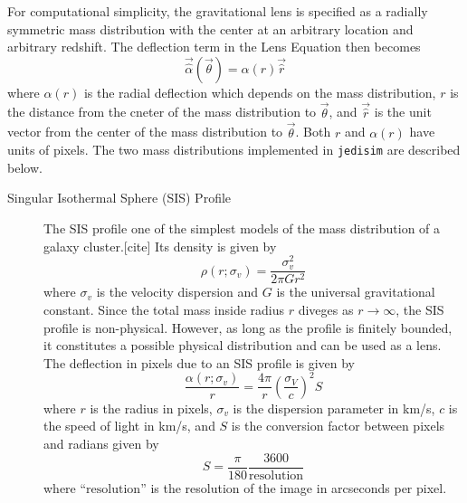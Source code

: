 \documentclass[10pt,twoside]{article}
\theoremstyle{definition}
\theoremstyle{exercise}
\begin{document}
For computational simplicity, the gravitational lens is specified as a radially symmetric mass distribution with the center at an arbitrary location and arbitrary redshift. The deflection term in the Lens Equation then becomes
\begin{equation}
  \vec{\hat{\alpha}}(\vec{\theta}) = \alpha(r) \vec{\hat{r}}
  \label{eq:rad_symm_lens_eq}
\end{equation}
where $\alpha(r)$ is the radial deflection which depends on the mass distribution, $r$ is the distance from the cneter of the mass distribution to $\vec{\theta}$, and $\vec{\hat{r}}$ is the unit vector from the center of the mass distribution to $\vec{\theta}$. Both $r$ and $\alpha(r)$ have units of pixels. The two mass distributions implemented in \texttt{jedisim} are described below.
\begin{description}
  \item[Singular Isothermal Sphere (SIS) Profile] The SIS profile one of the simplest models of the mass distribution of a galaxy cluster.[cite] Its density is given by
    \begin{equation}
      \rho(r; \sigma_v) = \frac{\sigma_v^2}{2\pi Gr^2}
      \label{eq:SIS_density}
    \end{equation}
    where $\sigma_v$ is the velocity dispersion and $G$ is the universal gravitational constant. Since the total mass inside radius $r$ diveges as $r \to \infty$, the SIS profile is non-physical. However, as long as the profile is finitely bounded, it constitutes a possible physical distribution and can be used as a lens. The deflection in pixels due to an SIS profile is given by 
    \begin{equation}
      \frac{\alpha(r; \sigma_v)}{r} = \frac{4\pi}{r}\left( \frac{\sigma_V}{c} \right)^2S
      \label{eq:SIS_deflection}
    \end{equation}
    where $r$ is the radius in pixels, $\sigma_v$ is the dispersion parameter in km/s, $c$ is the speed of light in km/s, and $S$ is the conversion factor between pixels and radians given by
    \begin{equation}
      S = \frac{\pi}{180}\frac{3600}{\text{resolution}}
      \label{eq:px_per_rad}
    \end{equation}
    where ``$\text{resolution}$'' is the resolution of the image in arcseconds per pixel.


\end{description}
\end{document}

